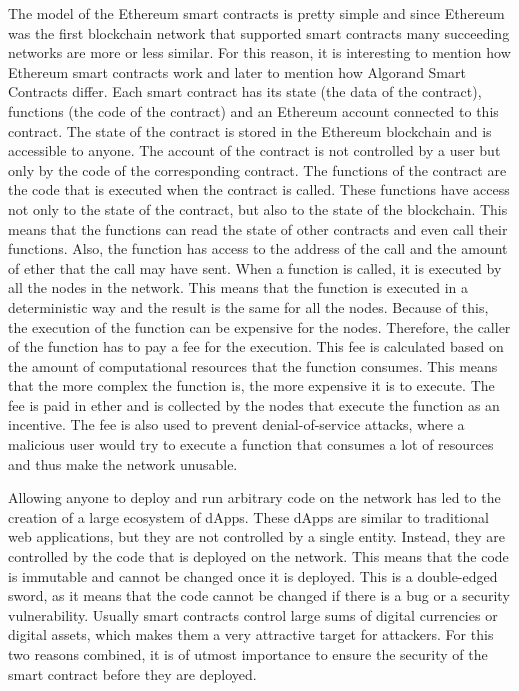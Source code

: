 The model of the Ethereum smart contracts is pretty simple and since Ethereum was the first blockchain network that supported smart contracts many succeeding networks are more or less similar. For this reason, it is interesting to mention how Ethereum smart contracts work and later to mention how Algorand Smart Contracts differ. Each smart contract has its state (the data of the contract), functions (the code of the contract) and an Ethereum account connected to this contract. The state of the contract is stored in the Ethereum blockchain and is accessible to anyone. The account of the contract is not controlled by a user but only by the code of the corresponding contract. The functions of the contract are the code that is executed when the contract is called. These functions have access not only to the state of the contract, but also to the state of the blockchain. This means that the functions can read the state of other contracts and even call their functions. Also, the function has access to the address of the call and the amount of ether that the call may have sent. When a function is called, it is executed by all the nodes in the network. This means that the function is executed in a deterministic way and the result is the same for all the nodes. Because of this, the execution of the function can be expensive for the nodes. Therefore, the caller of the function has to pay a fee for the execution. This fee is calculated based on the amount of computational resources that the function consumes. This means that the more complex the function is, the more expensive it is to execute. The fee is paid in ether and is collected by the nodes that execute the function as an incentive. The fee is also used to prevent denial-of-service attacks, where a malicious user would try to execute a function that consumes a lot of resources and thus make the network unusable.

Allowing anyone to deploy and run arbitrary code on the network has led to the creation of a large ecosystem of \acp{dApp}. These \acp{dApp} are similar to traditional web applications, but they are not controlled by a single entity. Instead, they are controlled by the code that is deployed on the network. This means that the code is immutable and cannot be changed once it is deployed. This is a double-edged sword, as it means that the code cannot be changed if there is a bug or a security vulnerability. Usually smart contracts control large sums of digital currencies or digital assets, which makes them a very attractive target for attackers. For this two reasons combined, it is of utmost importance to ensure the security of the smart contract before they are deployed.


